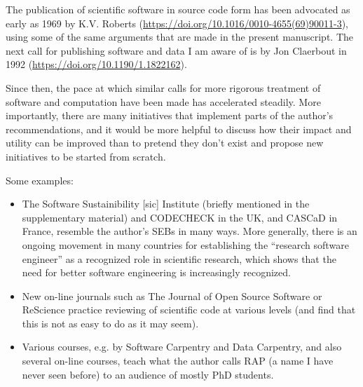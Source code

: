 \documentclass[11pt]{article}
\begin{document}
The publication of scientific software in source code form has been advocated as early as 1969 by K.V. Roberts (\url{https://doi.org/10.1016/0010-4655(69)90011-3}), using some of the same arguments that are made in the present manuscript. The next call for publishing software and data I am aware of is by Jon Claerbout in 1992 (\url{https://doi.org/10.1190/1.1822162}). 

Since then, the pace at which similar calls for more rigorous treatment of software and computation have been made has accelerated steadily. More importantly, there are many initiatives that implement parts of the author's recommendations, and it would be more helpful to discuss how their impact and utility can be improved than to pretend they don't exist and propose new initiatives to be started from scratch. 

Some examples:

\begin{itemize}\raggedright\item The Software Sustainibility [sic] Institute (briefly mentioned in the supplementary material) and CODECHECK in the UK, and CASCaD in France, resemble the author's SEBs in many ways. More generally, there is an ongoing movement in many countries for establishing the ``research software engineer'' as a recognized role in scientific research, which shows that the need for better software engineering is increasingly recognized. 
\item  New on-line journals such as The Journal of Open Source Software or ReScience practice reviewing of scientific code at various levels (and find that this is not as easy to do as it may seem). 
\item  Various courses, e.g. by Software Carpentry and Data Carpentry, and also several on-line courses, teach what the author calls RAP (a name I have never seen before) to an audience of mostly PhD students. 
\end{itemize}
\end{document}
